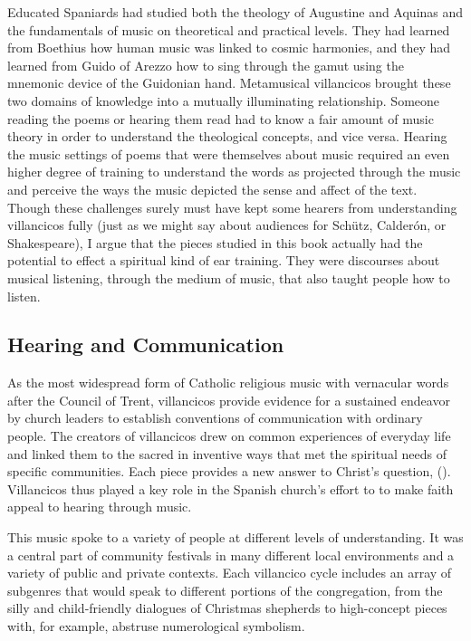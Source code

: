 Educated Spaniards had studied both the theology of Augustine and Aquinas and  
the fundamentals of music on theoretical and practical levels. 
They had learned from Boethius how human music was linked to cosmic harmonies,
and they had learned from Guido of Arezzo how to sing through the gamut using
the mnemonic device of the Guidonian hand.
Metamusical villancicos brought these two domains of knowledge into a mutually
illuminating relationship.
Someone reading the poems or hearing them read had to know a fair amount of
music theory in order to understand the theological concepts, and vice versa.
Hearing the music settings of poems that were themselves about music required
an even higher degree of training to understand the words as projected through
the music and perceive the ways the music depicted the sense and affect of the
text.
Though these challenges surely must have kept some hearers from understanding
villancicos fully (just as we might say about audiences for Schütz, Calderón,
or Shakespeare), I argue that the pieces studied in this book actually had the
potential to effect a spiritual kind of ear training. 
They were discourses about musical listening, through the medium of music, that
also taught people how to listen.

\subsection{Hearing and Communication}

As the most widespread form of Catholic religious music with vernacular words
after the Council of Trent, villancicos provide evidence for a sustained
endeavor by church leaders to establish conventions of communication with
ordinary people.
The creators of villancicos drew on common experiences of everyday life and
linked them to the sacred in inventive ways that met the spiritual needs of
specific communities.
Each piece provides a new answer to Christ's question, 
().
Villancicos thus played a key role in the Spanish church's effort to to make
faith appeal to hearing through music.

This music spoke to a variety of people at different levels of understanding.
It was a central part of community festivals in many different local
environments and a variety of public and private contexts. 
Each villancico cycle includes an array of subgenres that would speak to
different portions of the congregation, from the silly and child-friendly
dialogues of Christmas shepherds to high-concept pieces with, for
example, abstruse numerological symbolism.

